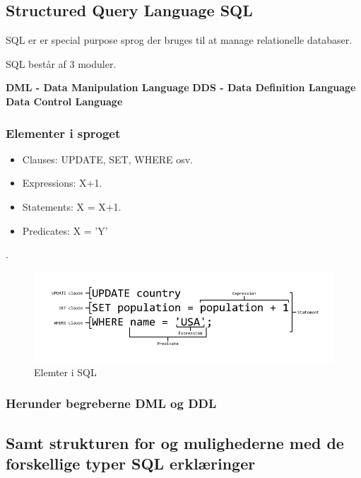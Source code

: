 \newpage

\subsection{Structured Query Language SQL}
SQL er er special purpose sprog der bruges til at manage relationelle databaser.

SQL består af 3 moduler.

\textbf{DML - Data Manipulation Language}
\textbf{DDS - Data Definition Language}
\textbf{Data Control Language}

\subsubsection{Elementer i sproget}

\begin{itemize}
	\item Clauses: UPDATE, SET, WHERE osv.
	\item Expressions: X+1.
	\item Statements: X = X+1.
	\item Predicates: X = 'Y'
\end{itemize}

.

\begin{figure}
\centering
\includegraphics[width=0.9\linewidth]{figs/spm7/sqlDecomp}
\caption{Elemter i SQL}
\label{fig:sqlDecomp}
\end{figure}

\subsubsection{Herunder begreberne DML og DDL}

\subsection{Samt strukturen for og mulighederne med de forskellige typer SQL erklæringer}